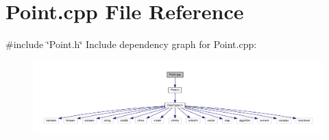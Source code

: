 \section{Point.\+cpp File Reference}
\label{_point_8cpp}
{\ttfamily \#include \char`\"{}Point.\+h\char`\"{}}\newline
Include dependency graph for Point.\+cpp\+:
\nopagebreak
\begin{figure}[H]
\begin{center}
\leavevmode
\includegraphics[width=350pt]{_point_8cpp__incl}
\end{center}
\end{figure}
